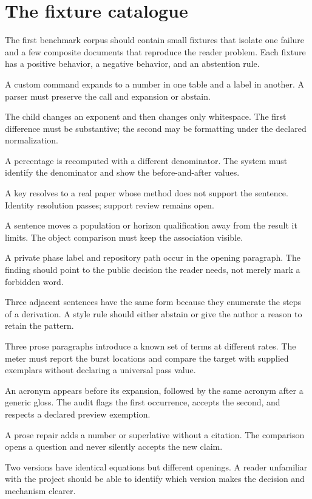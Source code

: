 \section{The fixture catalogue}
\label{sec:manual-fixtures}

The first benchmark corpus should contain small fixtures that isolate one
failure and a few composite documents that reproduce the reader problem. Each
fixture has a positive behavior, a negative behavior, and an abstention rule.

\begin{description}[style=nextline,leftmargin=33mm,labelindent=0mm]
\item[Macro fixture] A custom command expands to a number in one table and a
label in another. A parser must preserve the call and expansion or abstain.
\item[Equation fixture] The child changes an exponent and then changes only
whitespace. The first difference must be substantive; the second may be
formatting under the declared normalization.
\item[Table fixture] A percentage is recomputed with a different denominator.
The system must identify the denominator and show the before-and-after values.
\item[Citation fixture] A key resolves to a real paper whose method does not
support the sentence. Identity resolution passes; support review remains open.
\item[Qualification fixture] A sentence moves a population or horizon
qualification away from the result it limits. The object comparison must keep
the association visible.
\item[Register fixture] A private phase label and repository path occur in the
opening paragraph. The finding should point to the public decision the reader
needs, not merely mark a forbidden word.
\item[Intentional-pattern fixture] Three adjacent sentences have the same form
because they enumerate the steps of a derivation. A style rule should either
abstain or give the author a reason to retain the pattern.
\item[Pacing fixture] Three prose paragraphs introduce a known set of terms at
different rates. The meter must report the burst locations and compare the
target with supplied exemplars without declaring a universal pass value.
\item[First-use fixture] An acronym appears before its expansion, followed by
the same acronym after a generic gloss. The audit flags the first occurrence,
accepts the second, and respects a declared preview exemption.
\item[Assertion fixture] A prose repair adds a number or superlative without a
citation. The comparison opens a question and never silently accepts the new
claim.
\item[Reader fixture] Two versions have identical equations but different
openings. A reader unfamiliar with the project should be able to identify which version makes
the decision and mechanism clearer.
\end{description}

